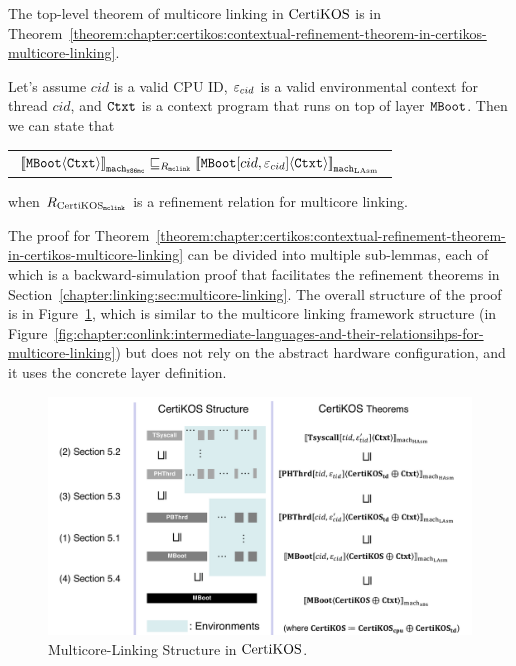 The top-level theorem of
multicore linking in $\mathrm{CertiKOS}$  is in Theorem~\ref{theorem:chapter:certikos:contextual-refinement-theorem-in-certikos-multicore-linking}.
\begin{theorem}
\label{theorem:chapter:certikos:contextual-refinement-theorem-in-certikos-multicore-linking}
Let's assume  $cid$ is a valid CPU ID, ${\varepsilon}_{cid}$ is a valid
environmental context for thread $cid$, and ${\mathrm{\texttt{Ctxt}}}$ is a
 context program that runs on top of layer ${\mathrm{\texttt{MBoot}}}$. 
 Then we can state that
 \begin{center}
\begin{tabular}{c}
${[\![{{\mathrm{\texttt{MBoot}}}} \langle {{\mathrm{\texttt{Ctxt}}}} \rangle]\!]}_{{\mathrm{\texttt{mach}}}_{{\mathrm{\texttt{x86mc}}}}} \sqsubseteq_{R_{{\mathrm{\texttt{mclink}}}}} {[\![{{\mathrm{\texttt{MBoot}}}[cid, {\varepsilon}_{cid}]} \langle {{\mathrm{\texttt{Ctxt}}}} \rangle]\!]}_{{{\mathrm{\texttt{mach}}}_{\mathrm{LAsm}}}}$\\
\end{tabular}
\end{center}
when ${R_{\mathrm{CertiKOS}_{\mathrm{\texttt{mclink}}}}}$ is a refinement relation for multicore linking.
\end{theorem}


The proof for Theorem~\ref{theorem:chapter:certikos:contextual-refinement-theorem-in-certikos-multicore-linking} 
can be divided into multiple sub-lemmas, each of which is a backward-simulation proof 
that facilitates the refinement theorems in Section~\ref{chapter:linking:sec:multicore-linking}. 
The overall structure of the proof is in Figure~\ref{fig:chapter:certikos:multicore-connect-proof-overall-structure}, which is 
similar to the multicore linking framework structure (in Figure~\ref{fig:chapter:conlink:intermediate-languages-and-their-relationsihps-for-multicore-linking}) but does not rely on
the abstract hardware configuration, and it uses the concrete layer definition. 
 
\begin{figure}
\includegraphics[width=\textwidth, page=2]{figs/certikos/concurrent_linking}
\caption{Multicore-Linking Structure in $\mathrm{CertiKOS}$.}
\label{fig:chapter:certikos:multicore-connect-proof-overall-structure}
\end{figure}


